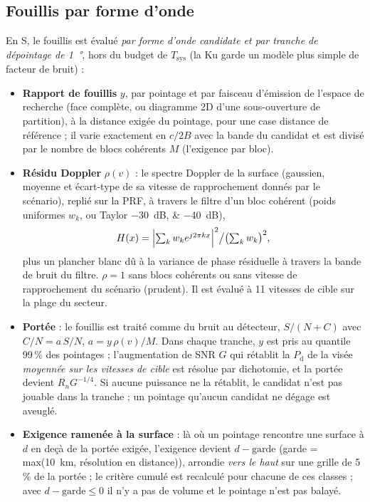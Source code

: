 \documentclass[11pt,a4paper]{article}
\newcommand{\Tsys}{T_{\mathrm{sys}}}
\newcommand{\Pd}{P_{\mathrm d}}
\begin{document}
\subsection{Fouillis par forme d'onde}\label{sec:clutter}
En S, le fouillis est évalué \emph{par forme d'onde candidate et par tranche de dépointage de \SI{1}{\degree}}, hors du
budget de $\Tsys$ (la Ku garde un modèle plus simple de facteur de bruit) :
\begin{itemize}
  \item \textbf{Rapport de fouillis} $y$, par pointage et par faisceau d'émission de l'espace de recherche (face
        complète, ou diagramme 2D d'une sous-ouverture de partition), à la distance exigée du pointage, pour une case
        distance de référence ; il varie exactement en $c/2B$ avec la bande du candidat et est divisé par le nombre de
        blocs cohérents $M$ (l'exigence par bloc).
  \item \textbf{Résidu Doppler} $\rho(v)$ : le spectre Doppler de la surface (gaussien, moyenne et écart-type de sa
        vitesse de rapprochement donnés par le scénario), replié sur la PRF, à travers le filtre d'un bloc cohérent
        (poids uniformes $w_k$, ou Taylor \SIlist{-30;-40}{dB}),
        \[ H(x) = \Bigl|\textstyle\sum_k w_k e^{j2\pi kx}\Bigr|^2 \big/ \bigl(\textstyle\sum_k w_k\bigr)^2, \]
        plus un plancher blanc dû à la variance de phase résiduelle à travers la bande de bruit du filtre. $\rho = 1$
        sans blocs cohérents ou sans vitesse de rapprochement du scénario (prudent). Il est évalué à 11 vitesses de
        cible sur la plage du secteur.
  \item \textbf{Portée} : le fouillis est traité comme du bruit au détecteur, $S/(N + C)$ avec $C/N = a\,S/N$,
        $a = y\,\rho(v)/M$. Dans chaque tranche, $y$ est pris au quantile 99\,\% des pointages ; l'augmentation de SNR
        $G$ qui rétablit la $\Pd$ de la visée \emph{moyennée sur les vitesses de cible} est résolue par dichotomie, et la
        portée devient $R_n G^{-1/4}$. Si aucune puissance ne la rétablit, le candidat n'est pas jouable dans la tranche ;
        un pointage qu'aucun candidat ne dégage est aveuglé.
  \item \textbf{Exigence ramenée à la surface} : là où un pointage rencontre une surface à $d$ en deçà de la portée
        exigée, l'exigence devient $d - \text{garde}$ (garde = max(\SI{10}{km}, résolution en distance)), arrondie
        \emph{vers le haut} sur une grille de 5\,\% de la portée ; le critère cumulé est recalculé pour chacune de ces
        classes ; avec $d - \text{garde} \le 0$ il n'y a pas de volume et le pointage n'est pas balayé.
\end{itemize}
\end{document}
